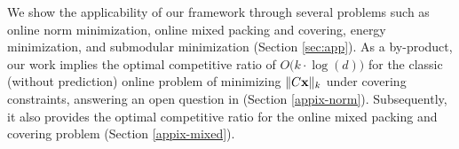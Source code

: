 We show the applicability of our framework through several problems such as online norm minimization, online mixed packing and covering, 
energy minimization, and submodular minimization (Section \ref{sec:app}). 
As a by-product, our work implies the optimal competitive ratio of $O\bigl( k \cdot \log (d)\bigr)$ 
for the classic (without prediction) online problem of minimizing $\|C \mathbf{x}\|_{k}$ under covering constraints, answering an open question in \cite{NagarajanShen17:Online-Covering} (Section \ref{appix-norm}). Subsequently, it also provides the optimal competitive ratio for the online mixed packing and covering problem (Section \ref{appix-mixed}).  

%
%
%
%
